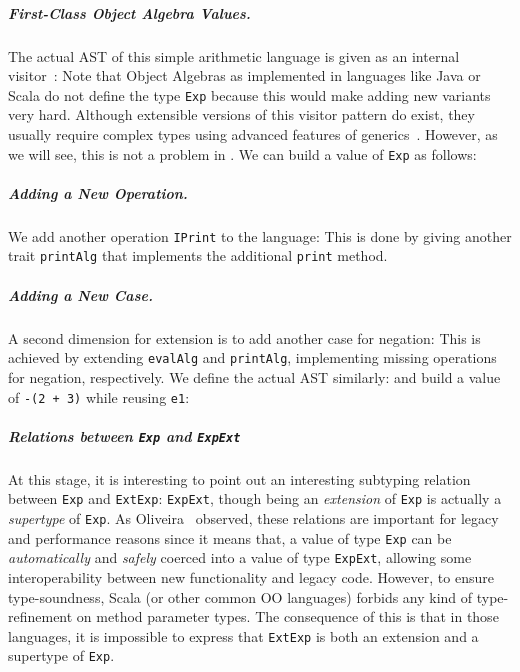 \subparagraph{First-Class Object Algebra Values.}
The actual AST of this simple arithmetic language is given as an internal
visitor~\cite{Oliveira_2008}:
Note that Object Algebras as implemented in languages like Java or Scala do not define the type
\lstinline{Exp} because this would make adding new variants very hard. Although extensible versions
of this visitor pattern do exist, they usually require complex types using advanced features of
generics~\cite{oliveira2012extensibility, togersen:2004}.
However, as we will see, this is not a problem in \name. We can build a value of \lstinline{Exp} as follows:


\subparagraph{Adding a New Operation.}
We add another operation \lstinline{IPrint} to the language:
This is done by giving another trait \lstinline{printAlg} that implements the
additional \lstinline{print} method.


\subparagraph{Adding a New Case.}
A second dimension for extension is to add another case for negation:
This is achieved by extending \lstinline{evalAlg} and \lstinline{printAlg}, implementing
missing operations for negation, respectively. We define the actual AST similarly:
and build a value of \lstinline{-(2 + 3)} while reusing \lstinline{e1}:

\subparagraph{Relations between \lstinline{Exp} and \lstinline{ExpExt}}
At this stage, it is interesting to point out an interesting subtyping relation
between \lstinline{Exp} and \lstinline{ExtExp}: \lstinline{ExpExt}, though being an
\emph{extension} of \lstinline{Exp} is actually a \emph{supertype} of \lstinline{Exp}.
As Oliveira~\cite{oliveira09modular} observed, these relations are
important for legacy and performance reasons since it means that, a value of
type \lstinline{Exp} can be \emph{automatically} and \emph{safely}
coerced into a value of type \lstinline{ExpExt}, allowing some
interoperability between new functionality and legacy code.
However, to ensure type-soundness, Scala (or other common OO languages) forbids any kind of type-refinement on method
parameter types. The consequence of this is that in those languages, it is
impossible to express that \lstinline{ExtExp} is both an extension and a
supertype of \lstinline{Exp}.


